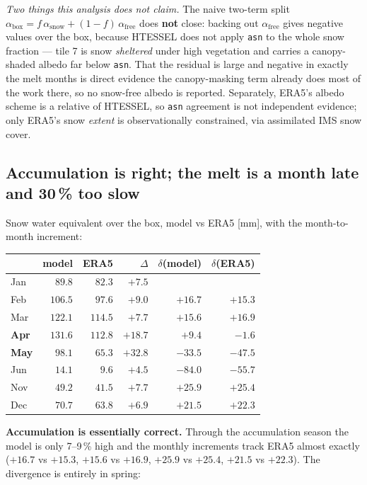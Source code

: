 \documentclass[10pt]{article}
\begin{document}
\emph{Two things this analysis does not claim.} The naive two-term split
$\alpha_{\mathrm{box}} = f\,\alpha_{\mathrm{snow}} + (1-f)\,\alpha_{\mathrm{free}}$ does
\textbf{not} close: backing out $\alpha_{\mathrm{free}}$ gives negative values over the box,
because HTESSEL does not apply \texttt{asn} to the whole snow fraction --- tile 7 is snow
\emph{sheltered} under high vegetation and carries a canopy-shaded albedo far below
\texttt{asn}. That the residual is large and negative in exactly the melt months is direct
evidence the canopy-masking term already does most of the work there, so no snow-free albedo
is reported. Separately, ERA5's albedo scheme is a relative of HTESSEL, so \texttt{asn}
agreement is not independent evidence; only ERA5's snow \emph{extent} is observationally
constrained, via assimilated IMS snow cover.

\subsection{Accumulation is right; the melt is a month late and 30\,\% too slow}\label{sub:melt}
Snow water equivalent over the box, model vs ERA5 [mm], with the month-to-month increment:

\begin{center}\footnotesize
\begin{tabular}{l r r r r r}
\toprule
 & model & ERA5 & $\Delta$ & $\delta$(model) & $\delta$(ERA5) \\
\midrule
Jan & $89.8$ & $82.3$ & $+7.5$ & & \\
Feb & $106.5$ & $97.6$ & $+9.0$ & $+16.7$ & $+15.3$ \\
Mar & $122.1$ & $114.5$ & $+7.7$ & $+15.6$ & $+16.9$ \\
\textbf{Apr} & $131.6$ & $112.8$ & $+18.7$ & $\mathbf{+9.4}$ & $\mathbf{-1.6}$ \\
\textbf{May} & $98.1$ & $65.3$ & $\mathbf{+32.8}$ & $\mathbf{-33.5}$ & $\mathbf{-47.5}$ \\
Jun & $14.1$ & $9.6$ & $+4.5$ & $-84.0$ & $-55.7$ \\
Nov & $49.2$ & $41.5$ & $+7.7$ & $+25.9$ & $+25.4$ \\
Dec & $70.7$ & $63.8$ & $+6.9$ & $+21.5$ & $+22.3$ \\
\bottomrule
\end{tabular}
\end{center}

\noindent \textbf{Accumulation is essentially correct.} Through the accumulation season the
model is only 7--9\,\% high and the monthly increments track ERA5 almost exactly
($+16.7$ vs $+15.3$, $+15.6$ vs $+16.9$, $+25.9$ vs $+25.4$, $+21.5$ vs $+22.3$). The
divergence is entirely in spring:
\end{document}
